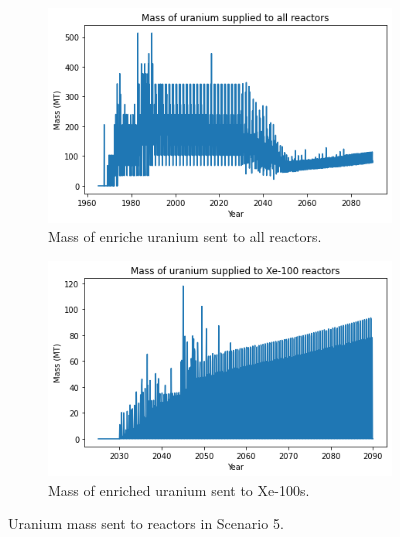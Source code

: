 \begin{figure}
    \centering
    \begin{subfigure}{0.5\textwidth}
        \centering
        \includegraphics[scale=0.5]{../figures/fuelsupply_scenarios_5.png}
        \caption{Mass of enriche uranium sent to all reactors.}
        \label{fig:totalfuel_5}
    \end{subfigure}
    \hspace{0.8cm}
    \begin{subfigure}{0.5\textwidth}
        \centering
        \includegraphics[scale=0.5]{../figures/advancedRX_fuelsupply_scenarios_5.png}
        \caption{Mass of enriched uranium sent to Xe-100s.}
        \label{fig:haleu_5}
    \end{subfigure}
    \caption{Uranium mass sent to reactors in Scenario 5.}
    \label{fig:fuel_5}
\end{figure}

